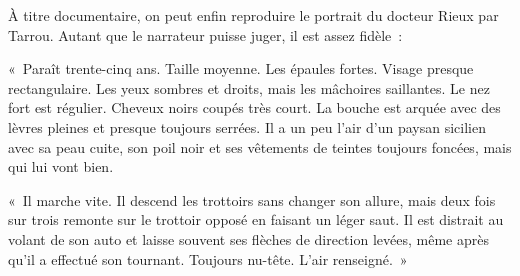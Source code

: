 \documentclass[french,twoside]{book} %
\begin{document}
À titre documentaire, on peut enfin reproduire le portrait du docteur Rieux par Tarrou. Autant que le narrateur puisse juger, il est assez fidèle :\par
« Paraît trente-cinq ans. Taille moyenne. Les épaules fortes. Visage presque rectangulaire. Les yeux sombres et droits, mais les mâchoires saillantes. Le nez fort est régulier. Cheveux noirs coupés très court. La bouche est arquée avec des lèvres pleines et presque toujours serrées. Il a un peu l’air d’un paysan sicilien avec sa peau cuite, son poil noir et ses vêtements de teintes toujours foncées, mais qui lui vont bien.\par
« Il marche vite. Il descend les trottoirs sans changer son allure, mais deux fois sur trois remonte sur le trottoir opposé en faisant un léger saut. Il est distrait au volant de son auto et laisse souvent ses flèches de direction levées, même après qu’il a effectué son tournant. Toujours nu-tête. L’air renseigné. »
\end{document}
